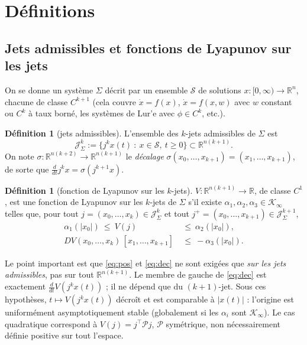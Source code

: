 \documentclass[11pt,a4paper]{article}
\theoremstyle{definition}
\newtheorem{definition}[theorem]{Définition}
\theoremstyle{remark}
\newcommand{\R}{\mathbb{R}}
\newcommand{\jet}[2]{j^{#1}#2}
\newcommand{\Jet}{\mathcal{J}}
\newcommand{\tr}{^{\top}}
\begin{document}
\section{Définitions}

\subsection{Jets admissibles et fonctions de Lyapunov sur les jets}
On se donne un système $\Sigma$ décrit par un ensemble $\mathcal S$ de solutions $x:[0,\infty)\to\R^n$, chacune de classe $C^{k+1}$ (cela couvre $\dot x=f(x)$, $\dot x = f(x,w)$ avec $w$ constant ou $C^{k}$ à taux borné, les systèmes de Lur'e avec $\phi\in C^k$, etc.).

\begin{definition}[jets admissibles]
L'ensemble des $k$-jets admissibles de $\Sigma$ est
\[
\Jet^k_\Sigma := \big\{\jet{k}{x}(t) \ :\ x\in\mathcal S,\ t\ge 0\big\}\subset \R^{n(k+1)}.
\]
On note $\sigma:\R^{n(k+2)}\to\R^{n(k+1)}$ le \emph{décalage} $\sigma(x_0,\dots,x_{k+1}) = (x_1,\dots,x_{k+1})$, de sorte que $\frac{d}{dt}\jet{k}{x} = \sigma(\jet{k+1}{x})$.
\end{definition}

\begin{definition}[fonction de Lyapunov sur les $k$-jets]\label{def:jetLF}
$V:\R^{n(k+1)}\to\R$, de classe $C^1$, est une fonction de Lyapunov sur les $k$-jets de $\Sigma$ s'il existe $\alpha_1,\alpha_2,\alpha_3\in\mathcal K_\infty$ telles que, pour tout $j=(x_0,\dots,x_k)\in\Jet^k_\Sigma$ et tout $j^+=(x_0,\dots,x_{k+1})\in\Jet^{k+1}_\Sigma$,
\begin{align}
\alpha_1(|x_0|)\ \le\ V(j)\ &\le\ \alpha_2(|x_0|), \label{eq:pos}\\
DV(x_0,\dots,x_k)\,[x_1,\dots,x_{k+1}]\ &\le\ -\alpha_3(|x_0|). \label{eq:dec}
\end{align}
\end{definition}
Le point important est que \eqref{eq:pos} et \eqref{eq:dec} ne sont exigées que \emph{sur les jets admissibles}, pas sur tout $\R^{n(k+1)}$. Le membre de gauche de \eqref{eq:dec} est exactement $\frac{d}{dt}V(\jet{k}{x}(t))$ ; il ne dépend que du $(k+1)$-jet. Sous ces hypothèses, $t\mapsto V(\jet{k}{x}(t))$ décroît et est comparable à $|x(t)|$ : l'origine est uniformément asymptotiquement stable (globalement si les $\alpha_i$ sont $\mathcal K_\infty$). Le cas quadratique correspond à $V(j) = j\tr\mathcal P j$, $\mathcal P$ symétrique, non nécessairement définie positive sur tout l'espace.
\end{document}

